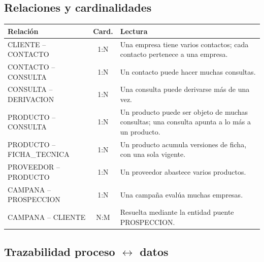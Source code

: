 \documentclass{article}
\begin{document}
\subsection{Relaciones y cardinalidades}

\begin{table}[H]
\centering
\small
\begin{tabularx}{\textwidth}{lcL}
\toprule
\textbf{Relación} & \textbf{Card.} & \textbf{Lectura} \\
\midrule
CLIENTE -- CONTACTO & 1:N & Una empresa tiene varios contactos; cada contacto pertenece a una empresa. \\
CONTACTO -- CONSULTA & 1:N & Un contacto puede hacer muchas consultas. \\
CONSULTA -- DERIVACION & 1:N & Una consulta puede derivarse más de una vez. \\
PRODUCTO -- CONSULTA & 1:N & Un producto puede ser objeto de muchas consultas; una consulta apunta a lo más a un producto. \\
PRODUCTO -- FICHA\_TECNICA & 1:N & Un producto acumula versiones de ficha, con una sola vigente. \\
PROVEEDOR -- PRODUCTO & 1:N & Un proveedor abastece varios productos. \\
CAMPANA -- PROSPECCION & 1:N & Una campaña evalúa muchas empresas. \\
CAMPANA -- CLIENTE & N:M & Resuelta mediante la entidad puente PROSPECCION. \\
\bottomrule
\end{tabularx}
\end{table}

\subsection{Trazabilidad proceso $\leftrightarrow$ datos}
\end{document}
